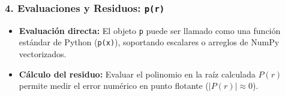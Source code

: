 \documentclass[12pt]{article}
\begin{document}
\begin{cajaflex}
\subsubsection*{\textcolor{teal!70!black}{4. Evaluaciones y Residuos: \texttt{p(r)}}}
\begin{itemize}
    \item \textbf{Evaluación directa:} El objeto \texttt{p} puede ser llamado como una función estándar de Python (\texttt{p(x)}), soportando escalares o arreglos de NumPy vectorizados.
    \item \textbf{Cálculo del residuo:} Evaluar el polinomio en la raíz calculada $P(r)$ permite medir el error numérico en punto flotante ($|P(r)| \approx 0$).
\end{itemize}

\end{cajaflex}

\end{document}
